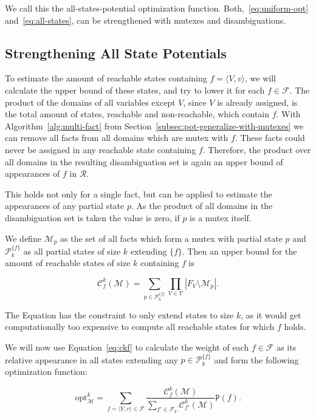 We call this the all-states-potential optimization function.
Both,~\eqref{eq:uniform-opt} and~\eqref{eq:all-states}, can be strengthened with mutexes and disambiguations.

\subsection{Strengthening All State Potentials}\label{subsec:strengthening-all-state-potential}
To estimate the amount of reachable states containing $f=\langle V,v \rangle$, we will calculate the upper bound of these states, and try to lower it for each $f\in\mathcal{F}$.
The product of the domains of all variables except $V$, since $V$ is already assigned, is the total amount of states, reachable and non-reachable, which contain $f$.
With Algorithm~\ref{alg:multi-fact} from Section~\ref{subsec:pot-generalize-with-mutexes} we can remove all facts from all domains which are mutex with $f$.
These facts could never be assigned in any reachable state containing $f$.
Therefore, the product over all domains in the resulting disambiguation set is again an upper bound of appearances of $f$ in $\mathcal{R}$.

This holds not only for a single fact, but can be applied to estimate the appearances of any partial state $p$.
As the product of all domains in the disambiguation set is taken the value is zero, if $p$ is a mutex itself.

We define $\mathcal{M}_p$ as the set of all facts which form a mutex with partial state $p$ and $\mathcal{P}_k^{\{f\}}$ as all partial states of size $k$ extending $\{f\}$.
Then an upper bound for the amount of reachable states of size $k$ containing $f$ is

\begin{equation}
    \mathcal{C}_f^k(\mathcal{M}) = \sum_{p\in\mathcal{P}_k^{\{f\}}}\prod_{V\in\mathcal{V}} |F_V\setminus\mathcal{M}_p|
.\label{eq:ckf}\end{equation}

The Equation has the constraint to only extend states to size $k$, as it would get computationally too expensive to compute all reachable states for which $f$ holds.

We will now use Equation~\eqref{eq:ckf} to calculate the weight of each $f\in\mathcal{F}$ as its relative appearance in all states extending any $p\in\mathcal{P}_k^{\{f\}}$ and form the following optimization function:

\begin{equation}
    \mathrm{opt}^k_\mathcal{M}=\sum_{f=\langle V,v \rangle\in\mathcal{F}}\frac{\mathcal{C}_f^k(\mathcal{M})}{\sum_{f'\in\mathcal{F}_V}\mathcal{C}_{f'}^k(\mathcal{M})}\mathtt{P}(f).
    \label{eq:opt1}
\end{equation}


